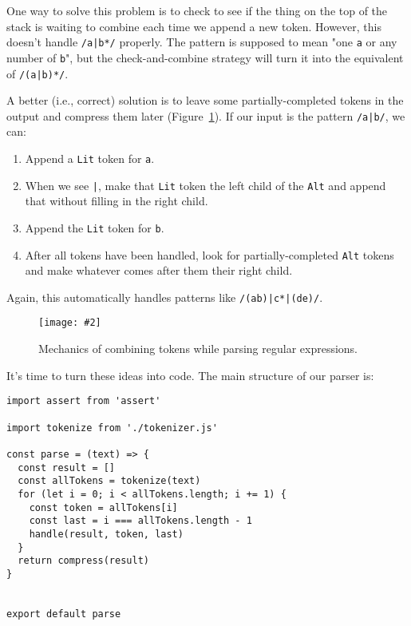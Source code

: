 \documentclass[krantzl]{krantz}
\newcommand{\figpdf}[4]{\begin{figure}%
\centering%
\texttt{[image: \#2]}%
\caption{#3}%
\label{#1}%
\end{figure}}
\newcommand{\figref}[1]{Figure~\ref{#1}}
\begin{document}
One way to solve this problem is to check to see if the thing on the top of the stack is waiting to combine
each time we append a new token.
However,
this doesn't handle \texttt{/a|b*/} properly.
The pattern is supposed to mean "one \texttt{a} or any number of \texttt{b}",
but the check-and-combine strategy will turn it into the equivalent of \texttt{/(a|b)*/}.


A better (i.e., correct) solution is
to leave some partially-completed tokens in the output and compress them later
(\figref{regex-parser-mechanics}).
If our input is the pattern \texttt{/a|b/}, we can:

\begin{enumerate}

\item 

Append a \texttt{Lit} token for \texttt{a}.



\item 

When we see \texttt{|},
    make that \texttt{Lit} token the left child of the \texttt{Alt}
    and append that without filling in the right child.



\item 

Append the \texttt{Lit} token for \texttt{b}.



\item 

After all tokens have been handled,
    look for partially-completed \texttt{Alt} tokens and make whatever comes after them their right child.



\end{enumerate}


Again, this automatically handles patterns like \texttt{/(ab)|c*|(de)/}.

\figpdf{regex-parser-mechanics}{./regex-parser/mechanics.pdf}{Mechanics of combining tokens while parsing regular expressions.}{0.6}


It's time to turn these ideas into code.
The main structure of our parser is:


\begin{lstlisting}[frame=single,frameround=tttt]
import assert from 'assert'

import tokenize from './tokenizer.js'

const parse = (text) => {
  const result = []
  const allTokens = tokenize(text)
  for (let i = 0; i < allTokens.length; i += 1) {
    const token = allTokens[i]
    const last = i === allTokens.length - 1
    handle(result, token, last)
  }
  return compress(result)
}


export default parse
\end{lstlisting}
\end{document}
